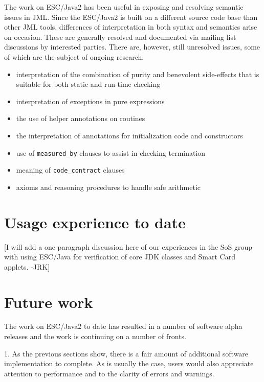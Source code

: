 \documentclass{acm_proc_article-sp}
\begin{document}
The work on ESC/Java2 has been useful in exposing and resolving
semantic issues in JML.  Since the ESC/Java2 is built on a different
source code base than other JML tools, differences of interpretation
in both syntax and semantics arise on occasion.  These are generally
resolved and documented via mailing list discussions by interested
parties.  There are, however, still unresolved issues, some of which
are the subject of ongoing research.
\setlength{\partopsep}{0in}\setlength{\parskip}{0in}\setlength{\itemsep}{0in}\setlength{\topsep}{0in}
\begin{itemize}
\setlength{\partopsep}{0in}\setlength{\parskip}{0in}\setlength{\itemsep}{0in}\setlength{\topsep}{0in}
\item interpretation of the combination of purity and benevolent
  side-effects that is suitable for both static and run-time checking
\item interpretation of exceptions in pure expressions
\item the use of helper annotations on routines
\item the interpretation of annotations for initialization code and
  constructors
\item use of \texttt{measured\_by} clauses to assist in checking
  termination
\item meaning of \texttt{code\_contract} clauses
\item axioms and reasoning procedures to handle safe
  arithmetic~\cite{Chalin03}
\end{itemize}

\section{Usage experience to date}
[I will add a one paragraph discussion here of our experiences in
the SoS group with using ESC/Java for verification of core JDK classes
and Smart Card applets. -JRK]

\section{Future work}
The work on ESC/Java2 to date has resulted in a number of software
alpha releases and the work is continuing on a number of fronts.

1. As the previous sections show, there is a fair amount of
  additional software implementation to complete.  As is usually the
  case, users would also appreciate attention to performance and to
  the clarity of errors and warnings.
\end{document}
